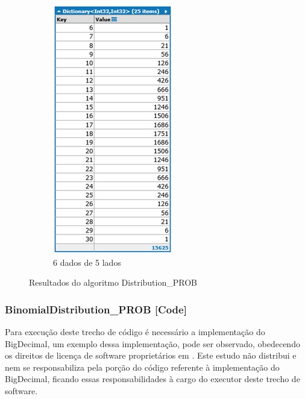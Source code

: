 \begin{apendicesenv}
\begin{figure}[H]
\begin{subfigure}[H]{0.47\linewidth}
		\includegraphics[width=.62\linewidth]{sections/images/Distribution_PROB_6_5.jpg}
		\caption{6 dados de 5 lados}
		\label{fig:Distribution_PROB_6_5}
		\end{subfigure}%
	\caption{Resultados do algoritmo Distribution\_PROB}
	\end{figure}

\subsubsection*{BinomialDistribution\_PROB [Code]}
Para execução deste trecho de código é necessário a implementação do BigDecimal, um exemplo dessa implementação, pode ser observado, obedecendo os direitos de licença de software proprietários em \cite{ github_bigdecimal}. Este estudo não distribui e nem se responsabiliza pela porção do código referente à implementação do BigDecimal, ficando essas responsabilidades  à cargo do executor deste trecho de software.


\end{apendicesenv}
